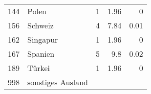 \begin{longtable}{lXrrr}
     144 &
     \multicolumn{1}{X}{ Polen   } &


       \num{1} &
       \num[round-mode=places,round-precision=2]{1,96} &
         \num[round-mode=places,round-precision=2]{0} \\

     156 &
     \multicolumn{1}{X}{ Schweiz   } &


       \num{4} &
       \num[round-mode=places,round-precision=2]{7,84} &
         \num[round-mode=places,round-precision=2]{0,01} \\

     162 &
     \multicolumn{1}{X}{ Singapur   } &


       \num{1} &
       \num[round-mode=places,round-precision=2]{1,96} &
         \num[round-mode=places,round-precision=2]{0} \\

     167 &
     \multicolumn{1}{X}{ Spanien   } &


       \num{5} &
       \num[round-mode=places,round-precision=2]{9,8} &
         \num[round-mode=places,round-precision=2]{0,02} \\

     189 &
     \multicolumn{1}{X}{ Türkei   } &


       \num{1} &
       \num[round-mode=places,round-precision=2]{1,96} &
         \num[round-mode=places,round-precision=2]{0} \\

     998 &
     \multicolumn{1}{X}{ sonstiges Ausland   } &



\end{longtable}
